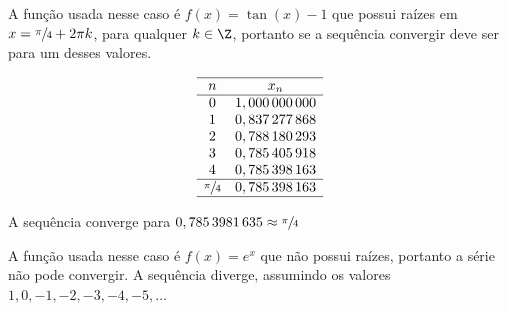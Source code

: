 \begin{exercises}
\begin{exercise}
\begin{answer}
\begin{alphalist}
  \item A função usada nesse caso é $f(x)=\tan(x)-1$ que possui raízes em
  $x=\sfrac{\pi}{4}+2\pi k$, para qualquer $k\in\Z$, portanto se a sequência
  convergir deve ser para um desses valores.
  \begin{ceqn}
  \[
  \begin{array}{cc} \hline
  	      n        &       x_n       \\ \hline
  	      0        & 1,000\,000\,000 \\
  	      1        & 0,837\,277\,868 \\
  	      2        & 0,788\,180\,293 \\
  	      3        & 0,785\,405\,918 \\
  	      4        & 0,785\,398\,163 \\ \hline
  	\sfrac{\pi}{4} & 0,785\,398\,163 \\ \hline
  \end{array}
  \]
  \end{ceqn}
  A sequência converge para $0,785\,3981\,635 \approx \sfrac{\pi}{4}$

  \item A função usada nesse caso é $f(x)=e^x$ que não possui raízes,
  portanto a série não pode convergir.
  A sequência diverge, assumindo os valores $1,0,-1,-2,-3,-4,-5,\dots$
\end{alphalist}
\end{answer}
\end{exercise}


\end{exercises}
